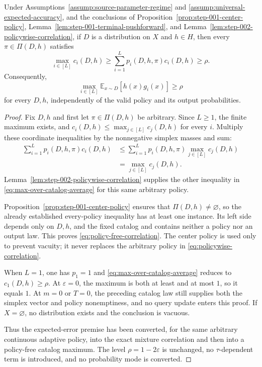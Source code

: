\begin{proposition}
\label{prop:step-002-policy-free-correlation}
Under Assumptions~\ref{assump:source-parameter-regime} and
\ref{assump:universal-expected-accuracy}, and the conclusions of
Proposition~\ref{prop:step-001-center-policy},
Lemma~\ref{lem:step-001-terminal-pushforward}, and
Lemma~\ref{lem:step-002-policywise-correlation}, if $D$ is a distribution on
$X$ and $h\in H$, then every $\pi\in\Pi(D,h)$ satisfies
\begin{equation}\label{eq:max-over-catalog-average}
\max_{i\in[L]}c_i(D,h)
\ge\sum_{i=1}^Lp_i(D,h,\pi)c_i(D,h)
\ge\rho.
\end{equation}
Consequently,
\begin{equation}\label{eq:policy-free-correlation}
\max_{i\in[L]}\mathbb E_{x\sim D}[h(x)g_i(x)]\ge\rho
\end{equation}
for every $D,h$, independently of the valid policy and its output
probabilities.
\end{proposition}

\begin{proof}
Fix $D,h$ and first let $\pi\in\Pi(D,h)$ be arbitrary.  Since $L\ge1$, the
finite maximum exists, and
$c_i(D,h)\le\max_{j\in[L]}c_j(D,h)$ for every $i$.  Multiply these
coordinate inequalities by the nonnegative simplex masses and sum:
\begin{align*}
\sum_{i=1}^Lp_i(D,h,\pi)c_i(D,h)
&\le\sum_{i=1}^Lp_i(D,h,\pi)
\max_{j\in[L]}c_j(D,h)\\
&=\max_{j\in[L]}c_j(D,h).
\end{align*}
Lemma~\ref{lem:step-002-policywise-correlation} supplies the other inequality
in \eqref{eq:max-over-catalog-average} for this same arbitrary policy.

Proposition~\ref{prop:step-001-center-policy} ensures that
$\Pi(D,h)\ne\varnothing$, so the already established every-policy inequality
has at least one instance.  Its left side depends only on $D,h$, and the fixed
catalog and contains neither a policy nor an output law.  This proves
\eqref{eq:policy-free-correlation}.  The center policy is used only to prevent
vacuity; it never replaces the arbitrary policy in
\eqref{eq:policywise-correlation}.

When $L=1$, one has $p_1=1$ and
\eqref{eq:max-over-catalog-average} reduces to $c_1(D,h)\ge\rho$.  At
$\varepsilon=0$, the maximum is both at least and at most $1$, so it equals
$1$.  At $m=0$ or $T=0$, the preceding catalog law still supplies both the
simplex vector and policy nonemptiness, and no query update enters this proof.
If $X=\varnothing$, no distribution exists and the conclusion is vacuous.

Thus the expected-error premise has been converted, for the same arbitrary
continuous adaptive policy, into the exact mixture correlation and then into
a policy-free catalog maximum.  The level $\rho=1-2\varepsilon$ is unchanged,
no $\tau$-dependent term is introduced, and no probability mode is converted.
\end{proof}

